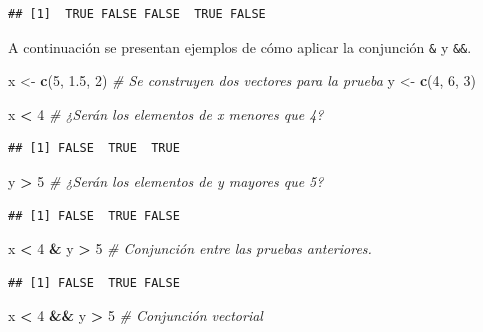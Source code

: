 \documentclass[10pt,]{krantz}
\makeatletter
\newenvironment{Shaded}{\begin{snugshade}}{\end{snugshade}}
\newcommand{\KeywordTok}[1]{\textcolor[rgb]{0.13,0.29,0.53}{\textbf{#1}}}
\newcommand{\DecValTok}[1]{\textcolor[rgb]{0.00,0.00,0.81}{#1}}
\newcommand{\FloatTok}[1]{\textcolor[rgb]{0.00,0.00,0.81}{#1}}
\newcommand{\StringTok}[1]{\textcolor[rgb]{0.31,0.60,0.02}{#1}}
\newcommand{\CommentTok}[1]{\textcolor[rgb]{0.56,0.35,0.01}{\textit{#1}}}
\newcommand{\OperatorTok}[1]{\textcolor[rgb]{0.81,0.36,0.00}{\textbf{#1}}}
\newcommand{\NormalTok}[1]{#1}
\newenvironment{kframe}{%
\medskip{}
\setlength{\fboxsep}{.8em}
 \def\at@end@of@kframe{}%
 \ifinner\ifhmode%
  \def\at@end@of@kframe{\end{minipage}}%
  \begin{minipage}{\columnwidth}%
 \fi\fi%
 \def\FrameCommand##1{\hskip\@totalleftmargin \hskip-\fboxsep
 \colorbox{shadecolor}{##1}\hskip-\fboxsep
     \hskip-\linewidth \hskip-\@totalleftmargin \hskip\columnwidth}%
 \MakeFramed {\advance\hsize-\width
   \@totalleftmargin\z@ \linewidth\hsize
   \@setminipage}}%
 {\par\unskip\endMakeFramed%
 \at@end@of@kframe}
\renewenvironment{Shaded}{\begin{kframe}}{\end{kframe}}
\makeatother
\begin{document}
\begin{verbatim}
## [1]  TRUE FALSE FALSE  TRUE FALSE
\end{verbatim}

A continuación se presentan ejemplos de cómo aplicar la conjunción
\texttt{\&} y \texttt{\&\&}.

\begin{Shaded}
\begin{Highlighting}[]
\NormalTok{x <-}\StringTok{ }\KeywordTok{c}\NormalTok{(}\DecValTok{5}\NormalTok{, }\FloatTok{1.5}\NormalTok{, }\DecValTok{2}\NormalTok{)  }\CommentTok{# Se construyen dos vectores para la prueba}
\NormalTok{y <-}\StringTok{ }\KeywordTok{c}\NormalTok{(}\DecValTok{4}\NormalTok{, }\DecValTok{6}\NormalTok{, }\DecValTok{3}\NormalTok{)}

\NormalTok{x }\OperatorTok{<}\StringTok{ }\DecValTok{4}  \CommentTok{# ¿Serán los elementos de x menores que 4?}
\end{Highlighting}
\end{Shaded}

\begin{verbatim}
## [1] FALSE  TRUE  TRUE
\end{verbatim}

\begin{Shaded}
\begin{Highlighting}[]
\NormalTok{y }\OperatorTok{>}\StringTok{ }\DecValTok{5}  \CommentTok{# ¿Serán los elementos de y mayores que 5?}
\end{Highlighting}
\end{Shaded}

\begin{verbatim}
## [1] FALSE  TRUE FALSE
\end{verbatim}

\begin{Shaded}
\begin{Highlighting}[]
\NormalTok{x }\OperatorTok{<}\StringTok{ }\DecValTok{4} \OperatorTok{&}\StringTok{ }\NormalTok{y }\OperatorTok{>}\StringTok{ }\DecValTok{5}  \CommentTok{# Conjunción entre las pruebas anteriores.}
\end{Highlighting}
\end{Shaded}

\begin{verbatim}
## [1] FALSE  TRUE FALSE
\end{verbatim}

\begin{Shaded}
\begin{Highlighting}[]
\NormalTok{x }\OperatorTok{<}\StringTok{ }\DecValTok{4} \OperatorTok{&&}\StringTok{ }\NormalTok{y }\OperatorTok{>}\StringTok{ }\DecValTok{5}  \CommentTok{# Conjunción vectorial}
\end{Highlighting}
\end{Shaded}
\end{document}
